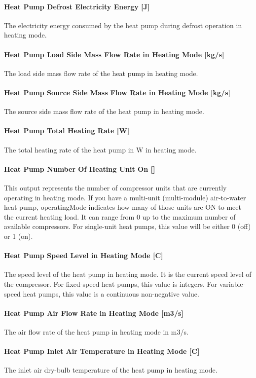 \paragraph{Heat Pump Defrost Electricity Energy {[}J{]}} The electricity energy
consumed by the heat pump during defrost operation in heating mode.
\paragraph{Heat Pump Load Side Mass Flow Rate in Heating Mode {[}kg/s{]}} The
load side mass flow rate of the heat pump in heating mode.
\paragraph{Heat Pump Source Side Mass Flow Rate in Heating Mode {[}kg/s{]}} The
source side mass flow rate of the heat pump in heating mode.
\paragraph{Heat Pump Total Heating Rate {[}W{]}} The total heating rate of the
heat pump in W in heating mode.
\paragraph{Heat Pump Number Of Heating Unit On {[}{]}} 
This output represents the number of compressor units that are currently operating
in heating mode. If you have a multi-unit (multi-module) air-to-water heat pump, 
operatingMode indicates how many of those units are ON to meet the current heating load.
It can range from 0 up to the maximum number of available compressors. For single-unit heat pumps,
this value will be either 0 (off) or 1 (on).
\paragraph{Heat Pump Speed Level in Heating Mode {[}C{]}} The speed level of the
heat pump in heating mode. It is the current speed level of the compressor. For
fixed-speed heat pumps, this value is integers. For variable-speed heat pumps,
this value is a continuous non-negative value.
\paragraph{Heat Pump Air Flow Rate in Heating Mode {[}m3/s{]}}
The air flow rate of the heat pump in heating mode in m3/s.
\paragraph{Heat Pump Inlet Air Temperature in Heating Mode {[}C{]}}
The inlet air dry-bulb temperature of the heat pump in heating mode.

